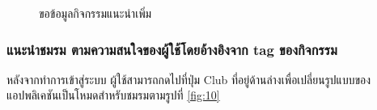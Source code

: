 \documentclass[14pt,oneside,openright,a4paper]{cpe-thai-project}
\begin{document}
\begin{figure}[H]\centering
  \setlength{\fboxrule}{0.5mm}
  \setlength{\fboxsep}{0.5cm}
  \caption{ขอข้อมูลกิจกรรมแนะนำเพิ่ม}\label{fig:7}
 \end{figure}

\subsubsection{แนะนําชมรม ตามความสนใจของผู้ใช้โดยอ้างอิงจาก tag ของกิจกรรม}
หลังจากทำการเข้าสู่ระบบ ผู้ใช้สามารถกดไปที่ปุ่ม Club ที่อยู่ด้านล่างเพื่อเปลี่ยนรูปแบบของแอปพลิเคชันเป็นโหมดสำหรับชมรมตามรูปที่ \ref{fig:10}
\end{document}
